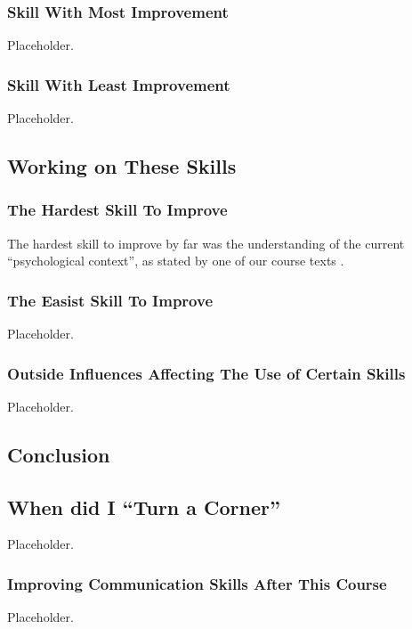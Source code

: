 \documentclass[stu,12pt]{apa7}
\begin{document}
      \subsubsection{Skill With Most Improvement}
        Placeholder.
      \subsubsection{Skill With Least Improvement}
        Placeholder.


    \subsection{Working on These Skills}
      \subsubsection{The Hardest Skill To Improve}
        The hardest skill to improve by far was the understanding of the current
          ``psychological context'', as stated by one of our course texts
          \parencite{noauthor_communication_2013}.
      \subsubsection{The Easist Skill To Improve}
        Placeholder.
      \subsubsection{Outside Influences Affecting The Use of Certain Skills}
        Placeholder.


    \subsection{Conclusion}
      \subsection{When did I ``Turn a Corner''}
        Placeholder.
      \subsubsection{Improving Communication Skills After This Course}
        Placeholder.




  \newpage
  \printbibliography[%
    title={References},%
    heading={bibintoc},%
    notcategory={consulted}%
  ]
  \newpage
  \nocite{*}
  \printbibliography[%
    title={Additional References},%
    heading={bibintoc},%
    category={consulted}%
  ]
\end{document}
